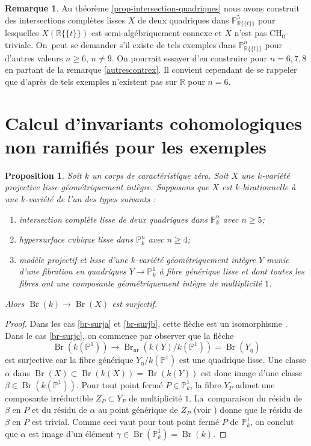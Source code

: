 \documentclass[JEP,XML,SOM,Unicode,francais,published]{cedram}
\newenvironment{enumeratea}
{\bgroup\def\theenumi{\alph{enumi}}\begin{enumerate}}
{\end{enumerate}\egroup}
\newcommand{\CH}{\mathrm{CH}}
\newtheorem{prop}[thm]{Proposition}
\theoremstyle{definition}
\newtheorem{rmk}[thm]{Remarque}
\newcommand{\R}{\mathbb R}
\renewcommand{\P}{\mathbb P}
\newcommand{\Br}{\operatorname{Br}}
\newcommand{\on}[1]{\operatorname{#1}}
\newcommand{\puiseux}{\mathbb{R}\{\!\{t\}\!\}}
\begin{document}
\begin{rmk}
Au théorème \ref{prop-intersection-quadriques} nous avons construit des intersections complètes lisses $X$ de deux
quadriques dans $\P^5_{\puiseux}$ pour lesquelles $X(\puiseux)$ est semi-algébriquement connexe et $X$ n'est pas $\CH_0$-triviale. On~peut se demander s'il existe de tels exemples dans $\P^n_{\puiseux}$ pour d'autres valeurs $n\geq 6$, $n\neq 9$.
On pourrait essayer d'en construire pour
$n=6,7,8$ en partant de la remarque \ref{autrescontrex}.
Il convient cependant de se rappeler que d'après \cite{hassett2022rationality}
de tels exemples n'existent pas sur $\R$ pour $n=6$.
\end{rmk}

\section{Calcul d'invariants cohomologiques non ramifiés pour les exemples}\label{calcul}

\begin{prop}\label{br-surj}
Soit $k$ un corps de caractéristique zéro.
Soit $X$ une $k$-variété projective lisse
géométriquement intègre. Supposons que $X$ est $k$-birationnelle à une $k$-variété
de l'un des types suivants :

\begin{enumeratea}
\item\label{br-surja}
intersection complète lisse de deux quadriques dans $\P^n_{k}$ avec $n \geq 5$;
\item\label{br-surjb}
hypersurface cubique lisse dans $\P^n_{k}$ avec $n \geq 4$;
\item\label{br-surjc}
modèle projectif et lisse d'une $k$-variété géométriquement intègre $Y$ munie d'une
fibration en quadriques $Y \to \P^1_k$ à fibre générique lisse et dont toutes les fibres ont une composante géométriquement intègre de multiplicité $1$.
\end{enumeratea}

Alors $\Br(k) \to \Br(X)$ est surjectif.
\end{prop}

\begin{proof}

Dans les cas \eqref{br-surja} et \eqref{br-surjb}, cette flèche est un isomorphisme \cite[Th.\,8.3.2]{colliot2021brauer}.
Dans le cas \eqref{br-surjc}, on commence par observer que la flèche
\[\Br(k(\P^1)) \to \Br_{\on{nr}}(k(Y)/k(\P^1))= \Br(Y_{\eta})\] est surjective car la fibre générique $Y_{\eta}/k(\P^1)$
est une quadrique lisse. Une classe $\alpha$ dans $\Br(X) \subset \Br(k(X))= \Br(k(Y))$
est donc image d'une classe $\beta \in \Br(k(\P^1))$. Pour tout point fermé $P\in \P^1_k$, la fibre $Y_P$ admet une composante irréductible $Z_P\subset Y_P$ de multiplicité $1$. La~comparaison du résidu de $\beta$ en $P$ et du résidu de $\alpha$ au point générique de $Z_P$ (voir \cite[Cor.\,11.1.6]{colliot2021brauer}) donne que le résidu de $\beta$ en $P$ est trivial. Comme ceci vaut pour tout point fermé $P$ de $\P^1_k$, on conclut que $\alpha$ est image d'un élément $\gamma \in \Br(\P^1_{k})=\Br(k)$.
\end{proof}
\end{document}
